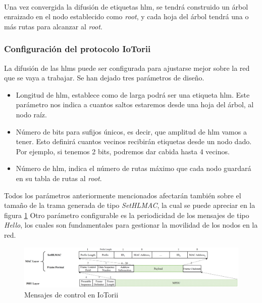 \\
Una vez convergida la difusión de etiquetas \gls{hlm}, se tendrá construido un árbol enraizado en el nodo establecido como \textit{root}, y cada hoja del árbol tendrá una o más rutas para alcanzar al \textit{root}.

\newpage




\subsubsection{Configuración del protocolo IoTorii}

La difusión de las \gls{hlm}s puede ser configurada para ajustarse mejor sobre la red que se vaya a trabajar. Se han dejado tres parámetros de diseño.

\begin{itemize}
    \item Longitud de \gls{hlm}, establece como de larga podrá ser una etiqueta \gls{hlm}. Este parámetro nos indica a cuantos saltos estaremos desde una hoja del árbol, al nodo raíz.
    \item Número de bits para sufijos únicos, es decir, que amplitud de \gls{hlm} vamos a tener. Esto definirá cuantos vecinos recibirán etiquetas desde un nodo dado. Por ejemplo, si tenemos 2 bits, podremos dar cabida hasta 4 vecinos.
    \item Número de \gls{hlm}, indica el número de rutas máximo que cada nodo guardará en su tabla de rutas al \textit{root}.
\end{itemize}

Todos los parámetros anteriormente mencionados afectarán también sobre el tamaño de la trama generada de tipo \textit{SetHLMAC}, la cual se puede apreciar en la figura \ref{fig:frameformat-setHLMAC} Otro parámetro configurable es la periodicidad de los mensajes de tipo \textit{Hello}, los cuales son fundamentales para gestionar la movilidad de los nodos en la red.

\begin{figure}[ht!]
    \centering
    \includegraphics[width=\textwidth]{archivos/img/analisis/Comparation_frame_iotorii.eps}
    \caption{Mensajes de control en IoTorii \cite{rojas2021outperforming}}
    \label{fig:frameformat-setHLMAC}
\end{figure}